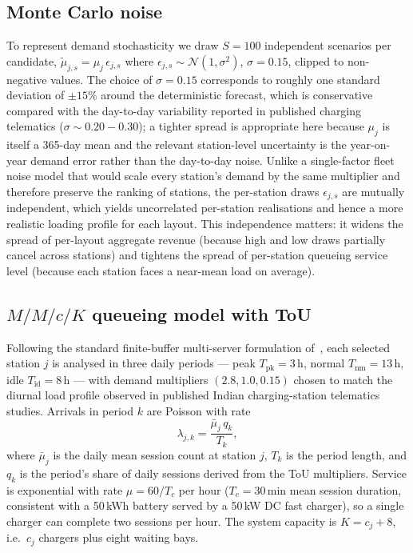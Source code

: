 \documentclass[conference]{IEEEtran}
\begin{document}
\subsection{Monte Carlo noise}
\label{subsec:mc}
To represent demand stochasticity we draw $S{=}100$ independent
scenarios per candidate,
$\tilde{\mu}_{j,s}=\mu_{j}\,\epsilon_{j,s}$ where
$\epsilon_{j,s}\sim\mathcal{N}(1,\sigma^2)$, $\sigma{=}0.15$, clipped
to non-negative values. The choice of $\sigma{=}0.15$ corresponds to
roughly one standard deviation of $\pm 15\%$ around the deterministic
forecast, which is conservative compared with the day-to-day
variability reported in published charging telematics
($\sigma\!\sim\!0.20\!-\!0.30$); a tighter spread is appropriate
here because $\mu_{j}$ is itself a 365-day mean and the relevant
station-level uncertainty is the year-on-year demand error rather
than the day-to-day noise. Unlike a single-factor fleet noise model
that would scale every station's demand by the same multiplier and
therefore preserve the ranking of stations, the per-station draws
$\epsilon_{j,s}$ are mutually independent, which yields uncorrelated
per-station realisations and hence a more realistic loading profile
for each layout. This independence matters: it widens the spread of
per-layout aggregate revenue (because high and low draws partially
cancel across stations) and tightens the spread of per-station
queueing service level (because each station faces a near-mean load
on average).

\subsection{$M/M/c/K$ queueing model with ToU}
\label{subsec:queue}
Following the standard finite-buffer multi-server formulation
of~\cite{ref_erlang_b_c,ref_mmck_ev_recent,ref_mmck_2025}, each
selected station $j$ is analysed in three daily periods --- peak
$T_{\text{pk}}{=}3$\,h, normal $T_{\text{nm}}{=}13$\,h, idle
$T_{\text{id}}{=}8$\,h --- with demand multipliers $(2.8, 1.0, 0.15)$
chosen to match the diurnal load profile observed in published
Indian charging-station telematics studies. Arrivals in period $k$
are Poisson with rate
\begin{equation}
\label{eq:lambda_k}
\lambda_{j,k} = \frac{\bar\mu_{j}\,q_{k}}{T_{k}},
\end{equation}
where $\bar\mu_{j}$ is the daily mean session count at station $j$,
$T_{k}$ is the period length, and $q_{k}$ is the period's share
of daily sessions derived from the ToU multipliers. Service is
exponential with rate $\mu{=}60/T_{c}$ per hour
($T_{c}{=}30$\,min mean session duration, consistent with a
50\,kWh battery served by a 50\,kW DC fast charger), so a single
charger can complete two sessions per hour. The system capacity is
$K{=}c_{j}+8$, i.e.\ $c_{j}$ chargers plus eight waiting bays.
\end{document}
